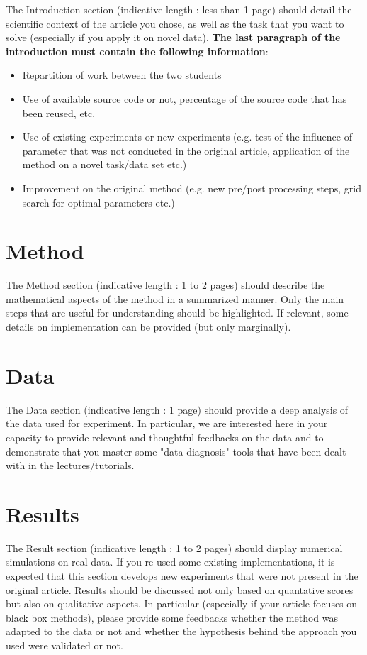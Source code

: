 \documentclass[11pt]{article}
\begin{document}
The Introduction section (indicative length : less than 1 page) should detail the scientific context of the article you chose, as well as the task that you want to solve (especially if you apply it on novel data). \textbf{The last paragraph of the introduction must contain the following information}:
\begin{itemize}
    \item Repartition of work between the two students
    \item Use of available source code or not, percentage of the source code that has been reused, etc.
    \item Use of existing experiments or new experiments (e.g. test of the influence of parameter that was not conducted in the original article, application of the method on a novel task/data set etc.)
    \item Improvement on the original method (e.g. new pre/post processing steps, grid search for optimal parameters etc.)
\end{itemize}

\section{Method}

The Method section (indicative length : 1 to 2 pages) should describe the mathematical aspects of the method in a summarized manner. Only the main steps that are useful for understanding should be highlighted. If relevant, some details on implementation can be provided (but only marginally).

\section{Data}
The Data section (indicative length : 1 page) should provide a deep analysis of the data used for experiment. In particular, we are interested here in your capacity to provide relevant and thoughtful feedbacks on the data and to demonstrate that you master some "data diagnosis" tools that have been dealt with in the lectures/tutorials.

\section{Results}
The Result section (indicative length : 1 to 2 pages) should display numerical simulations on real data. If you re-used some existing implementations, it is expected that this section develops new experiments that were not present in the original article. Results should be discussed not only based on quantative scores but also on qualitative aspects. In particular (especially if your article focuses on black box methods), please provide some feedbacks whether the method was adapted to the data or not and whether the hypothesis behind the approach you used were validated or not.
\end{document}
